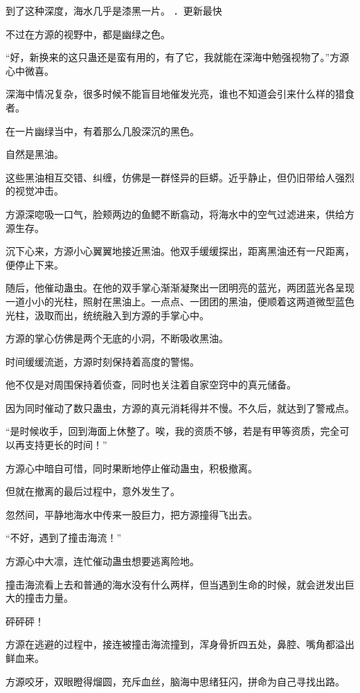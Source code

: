 
\begin{this_body}

到了这种深度，海水几乎是漆黑一片。 ．更新最快

不过在方源的视野中，都是幽绿之色。

“好，新换来的这只蛊还是蛮有用的，有了它，我就能在深海中勉强视物了。”方源心中微喜。

深海中情况复杂，很多时候不能盲目地催发光亮，谁也不知道会引来什么样的猎食者。

在一片幽绿当中，有着那么几股深沉的黑色。

自然是黑油。

这些黑油相互交错、纠缠，仿佛是一群怪异的巨蟒。近乎静止，但仍旧带给人强烈的视觉冲击。

方源深唿吸一口气，脸颊两边的鱼鳃不断翕动，将海水中的空气过滤进来，供给方源生存。

沉下心来，方源小心翼翼地接近黑油。他双手缓缓探出，距离黑油还有一尺距离，便停止下来。

随后，他催动蛊虫。在他的双手掌心渐渐凝聚出一团明亮的蓝光，两团蓝光各呈现一道小小的光柱，照射在黑油上。一点点、一团团的黑油，便顺着这两道微型蓝色光柱，汲取而出，统统融入到方源的手掌心中。

方源的掌心仿佛是两个无底的小洞，不断吸收黑油。

时间缓缓流逝，方源时刻保持着高度的警惕。

他不仅是对周围保持着侦查，同时也关注着自家空窍中的真元储备。

因为同时催动了数只蛊虫，方源的真元消耗得并不慢。不久后，就达到了警戒点。

“是时候收手，回到海面上休整了。唉，我的资质不够，若是有甲等资质，完全可以再支持更长的时间！”

方源心中暗自可惜，同时果断地停止催动蛊虫，积极撤离。

但就在撤离的最后过程中，意外发生了。

忽然间，平静地海水中传来一股巨力，把方源撞得飞出去。

“不好，遇到了撞击海流！”

方源心中大凛，连忙催动蛊虫想要逃离险地。

撞击海流看上去和普通的海水没有什么两样，但当遇到生命的时候，就会迸发出巨大的撞击力量。

砰砰砰！

方源在逃避的过程中，接连被撞击海流撞到，浑身骨折四五处，鼻腔、嘴角都溢出鲜血来。

方源咬牙，双眼瞪得熘圆，充斥血丝，脑海中思绪狂闪，拼命为自己寻找出路。


\end{this_body}
